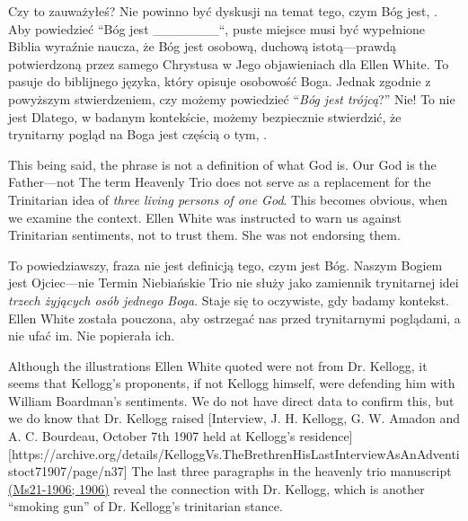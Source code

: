 Czy to zauważyłeś? Nie powinno być dyskusji na temat tego, czym Bóg jest,  . Aby powiedzieć “Bóg jest \_\_\_\_\_\_\_“, puste miejsce musi być wypełnione  Biblia wyraźnie naucza, że Bóg jest osobową, duchową istotą—prawdą potwierdzoną przez samego Chrystusa w Jego objawieniach dla Ellen White. To pasuje do biblijnego języka, który opisuje osobowość Boga. Jednak zgodnie z powyższym stwierdzeniem, czy możemy powiedzieć “\textit{Bóg jest trójcą}?” Nie! To nie jest  Dlatego, w badanym kontekście, możemy bezpiecznie stwierdzić, że trynitarny pogląd na Boga jest częścią  o tym, .


This being said, the phrase  is not a definition of what God is. Our God is the Father—not  The term Heavenly Trio does not serve as a replacement for the Trinitarian idea of \textit{three living persons of one God}. This becomes obvious, when we examine the context. Ellen White was instructed to warn us against Trinitarian sentiments, not to trust them. She was not endorsing them.


To powiedziawszy, fraza  nie jest definicją tego, czym jest Bóg. Naszym Bogiem jest Ojciec—nie  Termin Niebiańskie Trio nie służy jako zamiennik trynitarnej idei \textit{trzech żyjących osób jednego Boga}. Staje się to oczywiste, gdy badamy kontekst. Ellen White została pouczona, aby ostrzegać nas przed trynitarnymi poglądami, a nie ufać im. Nie popierała ich.


Although the illustrations Ellen White quoted were not from Dr. Kellogg, it seems that Kellogg's proponents, if not Kellogg himself, were defending him with William Boardman's sentiments. We do not have direct data to confirm this, but we do know that Dr. Kellogg raised [Interview, J. H. Kellogg, G. W. Amadon and A. C. Bourdeau, October 7th 1907 held at Kellogg’s residence][https://archive.org/details/KelloggVs.TheBrethrenHisLastInterviewAsAnAdventistoct71907/page/n37] The last three paragraphs in the heavenly trio manuscript \href{https://egwwritings.org/?ref=en_Ms21-1906&para=9754.1}{(Ms21-1906; 1906)} reveal the connection with Dr. Kellogg, which is another “smoking gun” of Dr. Kellogg's trinitarian stance.


